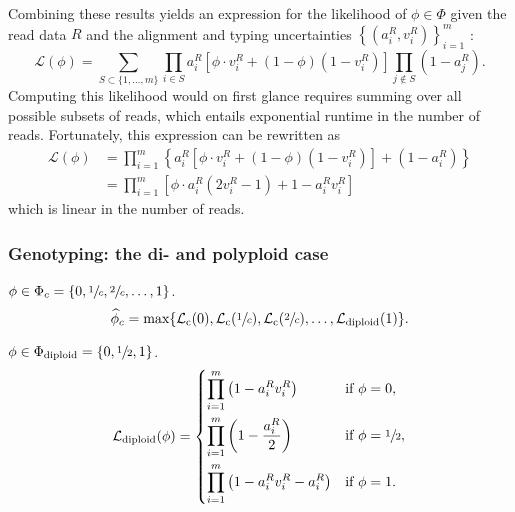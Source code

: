 \documentclass[a4paper,12pt]{article}
\begin{document}
Combining these results yields an expression for the likelihood of $\phi \in \Phi$ given the read data $R$ and the alignment and typing uncertainties  $\left\{(a_i^R, v_i^R)\right\}_{i=1}^m$ : 
\begin{equation}
 \mathcal{L}(\phi) = \sum_{S \subset \{1,\dots,m\}} \prod_{i \in S} a_i^R \left[\phi \cdot v_i^R + (1 - \phi)\left(1 - v_i^R \right) \right] \prod_{j \not \in S} \left(1 - a_j^R\right). 
\end{equation}
Computing this likelihood would on first glance requires summing over all possible subsets of reads, which entails exponential runtime in the number of reads. Fortunately, this expression can be rewritten as  
\begin{equation}
  \begin{aligned}
  \mathcal{L}(\phi) & = \prod_{i = 1}^m \left\{a_i^R \left[\phi \cdot v_i^R + (1 - \phi)\left(1 - v_i^R \right)\right] + \left(1 - a_i^R\right) \right\} \\
		    & = \prod_{i = 1}^m \left[\phi \cdot  a_i^R\left(2 v_i^R - 1 \right) + 1 - a_i^R v_i^R \right]
  \end{aligned}
\end{equation}
which is linear in the number of reads. 






\subsubsection{Genotyping: the di- and polyploid case}

$\phi \in \Phi_c = \{0, \sfrac{1}{c}, \sfrac{2}{c}, \dots, 1\}$. 
\begin{equation}
 \widehat{\phi}_c = \text{max} \{ \mathcal{L}_\text{c}(0), \mathcal{L}_\text{c}(\sfrac{1}{c}), \mathcal{L}_\text{c}(\sfrac{2}{c}), \dots, \mathcal{L}_\text{diploid}(1) \}. 
\end{equation}


$\phi \in \Phi_{\text{diploid}} = \{0, \sfrac{1}{2}, 1\}$. 
\begin{equation}
 \mathcal{L}_\text{diploid}(\phi) = \begin{dcases}
				      \prod_{i = 1}^m \left(1 - a_i^R v_i^R\right) & \text{if } \phi = 0, \\ 
				      \prod_{i = 1}^m \left(1 - \frac{a_i^R}{2}\right) & \text{if } \phi = \sfrac{1}{2}, \\ 
				      \prod_{i = 1}^m \left(1 - a_i^R v_i^R - a_i^R\right) & \text{if } \phi = 1. 
                                    \end{dcases}
\end{equation}
\end{document}
